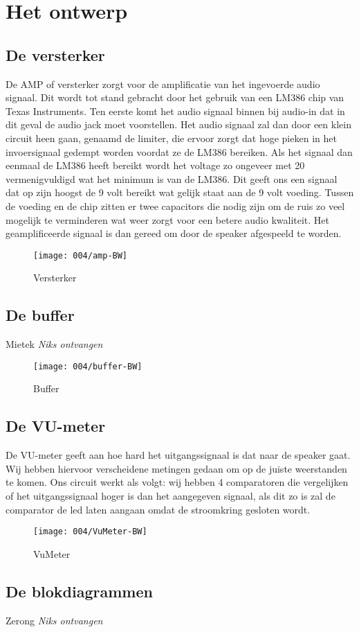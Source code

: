 \section{Het ontwerp}
\subsection{De versterker}
De AMP of versterker zorgt voor de amplificatie van het ingevoerde audio signaal. Dit wordt tot stand gebracht door het gebruik van een LM386 chip van Texas Instruments.  Ten eerste komt het audio signaal binnen bij audio-in dat in dit geval de audio jack moet voorstellen. Het audio signaal zal dan door een klein circuit heen gaan, genaamd de limiter, die ervoor zorgt dat hoge pieken in het invoersignaal gedempt worden voordat ze de LM386 bereiken. Als het signaal dan eenmaal de LM386 heeft bereikt wordt het voltage zo ongeveer met 20 vermenigvuldigd wat het minimum is van de LM386. Dit geeft ons een signaal dat op zijn hoogst de 9 volt bereikt wat gelijk staat aan de 9 volt voeding. Tussen de voeding en de chip zitten er twee capacitors die nodig zijn om de ruis zo veel mogelijk te verminderen wat weer zorgt voor een betere audio kwaliteit. Het geamplificeerde signaal is dan gereed om door de speaker afgespeeld te worden. 
\begin{figure}[ht]
    \centering
    \texttt{[image: 004/amp-BW]}
    \caption{Versterker}
    \label{fig:Versterker}
\end{figure}

\subsection{De buffer}
Mietek
\textit{Niks ontvangen}
\begin{figure}[ht]
    \centering
    \texttt{[image: 004/buffer-BW]}
    \caption{Buffer}
    \label{fig:Buffer}
\end{figure}

\subsection{De VU-meter}
De VU-meter geeft aan hoe hard het uitgangssignaal is dat naar de speaker gaat. Wij hebben hiervoor verscheidene metingen gedaan om op de juiste weerstanden te komen. Ons circuit werkt als volgt: wij hebben 4 comparatoren die vergelijken of het uitgangssignaal hoger is dan het aangegeven signaal, als dit zo is zal de comparator de led laten aangaan omdat de stroomkring gesloten wordt. 
\begin{figure}[ht]
    \centering
    \texttt{[image: 004/VuMeter-BW]}
    \caption{VuMeter}
    \label{fig:VuMeter}
\end{figure}

\subsection{De blokdiagrammen}
Zerong
\textit{Niks ontvangen}